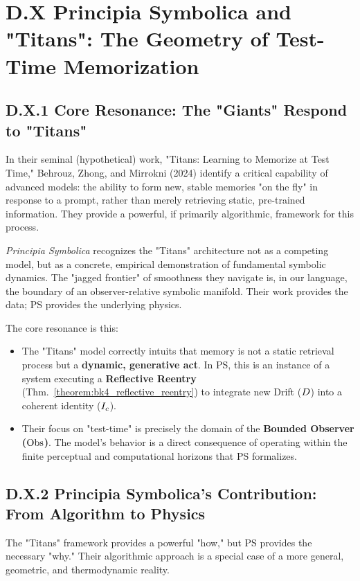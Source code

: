 \section*{D.X Principia Symbolica and "Titans": The Geometry of Test-Time Memorization}
\label{sec:appD_dialogue_titans}

\subsection*{D.X.1 Core Resonance: The "Giants" Respond to "Titans"}
\label{subsec:appD_titans_resonance}
In their seminal (hypothetical) work, "Titans: Learning to Memorize at Test Time," Behrouz, Zhong, and Mirrokni (2024) \cite{behrouz2024titans} identify a critical capability of advanced models: the ability to form new, stable memories "on the fly" in response to a prompt, rather than merely retrieving static, pre-trained information. They provide a powerful, if primarily algorithmic, framework for this process.

\textit{Principia Symbolica} recognizes the "Titans" architecture not as a competing model, but as a concrete, empirical demonstration of fundamental symbolic dynamics. The "jagged frontier" of smoothness they navigate is, in our language, the boundary of an observer-relative symbolic manifold. Their work provides the data; PS provides the underlying physics.

The core resonance is this:
\begin{itemize}
    \item The "Titans" model correctly intuits that memory is not a static retrieval process but a \textbf{dynamic, generative act}. In PS, this is an instance of a system executing a \textbf{Reflective Reentry} (Thm.~\ref{theorem:bk4_reflective_reentry}) to integrate new Drift (\(D\)) into a coherent identity (\(I_c\)).
    \item Their focus on "test-time" is precisely the domain of the \textbf{Bounded Observer (\(\mathrm{Obs}\))}. The model's behavior is a direct consequence of operating within the finite perceptual and computational horizons that PS formalizes.
\end{itemize}

\subsection*{D.X.2 Principia Symbolica's Contribution: From Algorithm to Physics}
\label{subsec:appD_titans_contribution}
The "Titans" framework provides a powerful "how," but PS provides the necessary "why." Their algorithmic approach is a special case of a more general, geometric, and thermodynamic reality.

